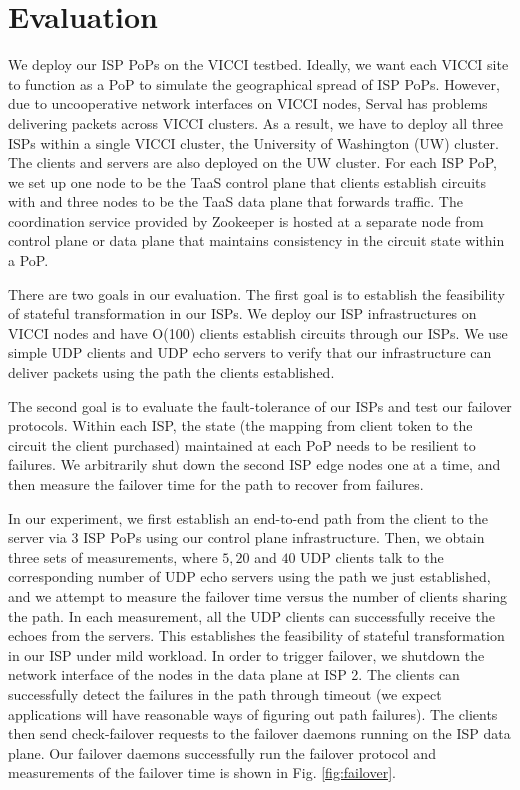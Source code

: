 \documentclass{article}
\begin{document}
\section{Evaluation}

We deploy our ISP PoPs on the VICCI testbed.
Ideally, we want each VICCI site to function
as a PoP to simulate the geographical spread of ISP PoPs.
However, due to uncooperative network interfaces on VICCI nodes,
Serval has problems delivering packets across VICCI clusters.
As a result, we have to deploy all three ISPs within a single VICCI cluster,
 the University of Washington (UW) cluster. The clients and servers are also deployed
 on the UW cluster.
For each ISP PoP, we set up
one node to be the TaaS control plane that clients establish circuits with
and three nodes to be the TaaS data plane that forwards
traffic. The coordination service provided by Zookeeper is hosted
at a separate node from control plane or data plane that maintains consistency
in the circuit state within a PoP.

There are two goals in our evaluation. The first goal is to establish
the feasibility of stateful transformation in our ISPs. We
deploy our ISP infrastructures on VICCI nodes and have O(100)
clients establish circuits through our ISPs. We use simple UDP clients
and UDP echo servers to verify that our infrastructure can deliver packets
using the path the clients established.

The second goal is to evaluate the fault-tolerance of our ISPs and test
our failover protocols.
 Within each ISP, the state (the mapping from client token to the circuit the
client purchased) maintained at each PoP needs to be resilient to
failures. We arbitrarily shut down the second ISP edge nodes one at a time,
 and then measure the failover time for the path to recover from failures.

In our experiment, we first establish an end-to-end path from the client
to the server via 3 ISP PoPs using our control plane infrastructure.
Then, we obtain three sets of measurements, where
 $5, 20$ and $40$ UDP clients talk to the corresponding
number of UDP echo servers using the path we just established, and
we attempt to measure the failover time versus the number of clients
sharing the path.
In each measurement, all the UDP clients can successfully receive
the echoes from the servers. This establishes the feasibility of
stateful transformation in our ISP under mild workload.
In order to trigger failover, we shutdown the network interface of the
nodes in the data plane at ISP 2. The clients can successfully detect
the failures in the path through timeout (we expect applications will
have reasonable ways of figuring out path failures). The clients then
send check-failover requests to the failover daemons running on the
ISP data plane. Our failover daemons successfully run the failover
protocol and measurements of the failover time is shown in Fig. \ref{fig:failover}.
\end{document}
